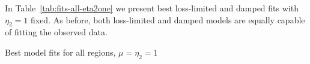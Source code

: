 \documentclass[iop, apj, numberedappendix]{emulateapj}
\begin{document}
%    
%
%    

%    

In Table~\ref{tab:fits-all-eta2one} we present best loss-limited and
damped fits with $\eta_2 = 1$ fixed.  As before, both loss-limited and damped
models are equally capable of fitting the observed data.

\begin{table}
    \scriptsize
    \centering
    \caption{Best model fits for all regions, $\mu = \eta_2 = 1$
    \label{tab:fits-all-eta2one}}
    
\end{table}
\end{document}
